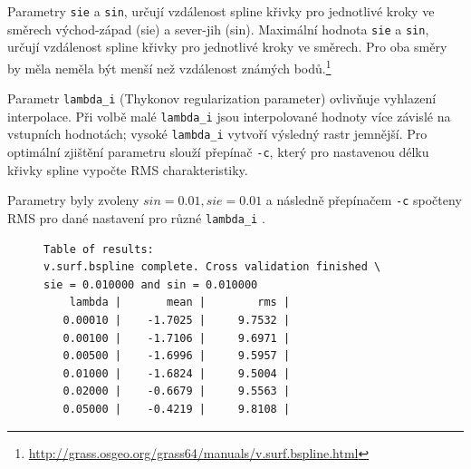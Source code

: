 \documentclass[a4paper,12pt,oneside]{report}
\begin{document}
\begin{description}

\item Parametry \texttt{sie} a \texttt{sin}, určují vzdálenost spline
  křivky pro jednotlivé kroky ve směrech východ-západ (sie) a
  sever-jih (sin). Maximální hodnota \texttt{sie} a \texttt{sin}, určují vzdálenost spline
  křivky pro jednotlivé kroky ve směrech. Pro oba směry by měla neměla 
  být menší než vzdálenost známých bodů.\footnote{\url{http://grass.osgeo.org/grass64/manuals/v.surf.bspline.html}}

\item Parametr \texttt{lambda\_i} (Thykonov regularization parameter)
  ovlivňuje vyhlazení interpolace. Při volbě malé \texttt{lambda\_i}
  jsou interpolované hodnoty více závislé na vstupních hodnotách;
  vysoké \texttt{lambda\_i} vytvoří výsledný rastr jemnější. Pro
  optimální zjištění parametru slouží přepínač \texttt{-c}, který pro
  nastavenou délku křivky spline vypočte RMS charakteristiky.
\end{description}


Parametry byly zvoleny $sin=0.01, sie=0.01$ a následně přepínačem
\texttt{-c} spočteny RMS pro dané nastavení pro různé
\texttt{lambda\_i} .
\begin{figure}[h!]
\begin{footnotesize}
\lstset{extendedchars=false,
escapeinside=''}
\begin{lstlisting}[style=mybash]
Table of results:
v.surf.bspline complete. Cross validation finished \
sie = 0.010000 and sin = 0.010000
    lambda |       mean |        rms |
   0.00010 |    -1.7025 |     9.7532 |
   0.00100 |    -1.7106 |     9.6971 |
   0.00500 |    -1.6996 |     9.5957 |
   0.01000 |    -1.6824 |     9.5004 |
   0.02000 |    -0.6679 |     9.5563 |
   0.05000 |    -0.4219 |     9.8108 |
\end{lstlisting}
\end{footnotesize} 
\end{figure}
\end{document}
